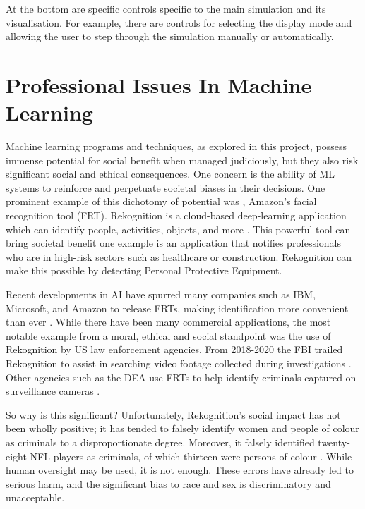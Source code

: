 \documentclass[]{final_report}
\begin{document}
At the bottom are specific controls specific to the main simulation and its visualisation. For example, there are controls for selecting the display mode and allowing the user to step through the simulation manually or automatically. 

\chapter{Professional Issues In Machine Learning}

Machine learning programs and techniques, as explored in this project, possess immense potential for social benefit when managed judiciously, but they also risk significant social and ethical consequences\cite{AISocialImpactAndAccountability}. One concern is the ability of ML systems to reinforce and perpetuate societal biases in their decisions\cite{AISocialImpactAndAccountability}. One prominent example of this dichotomy of potential was , Amazon's facial recognition tool (FRT)\cite{legislatingOG}. Rekognition is a cloud-based deep-learning application which can identify people, activities, objects, and more \cite{rekognitionOverview}. This powerful tool can bring societal benefit one example is an application that notifies professionals who are in high-risk sectors such as healthcare or construction\cite{rekognitionOverview}. Rekognition can make this possible by detecting Personal Protective Equipment. 

Recent developments in AI have spurred many companies such as IBM, Microsoft, and Amazon to release FRTs, making identification more convenient than ever \cite{facialRecognitionEthicsSurvay}. While there have been many commercial applications, the most notable example from a moral, ethical and social standpoint was the use of Rekognition by US law enforcement agencies. From 2018-2020 the FBI trailed Rekognition to assist in searching video footage collected during investigations \cite{facialRecognitionBias}. Other agencies such as the DEA use FRTs to help identify criminals captured on surveillance cameras \cite{facialRecognitionBias}. 

So why is this significant? Unfortunately, Rekognition's social impact has not been wholly positive; it has tended to falsely identify women and people of colour as criminals to a disproportionate degree\cite{legislatingRekognition}. Moreover, it falsely identified twenty-eight NFL players as
criminals, of which thirteen were persons of colour \cite{facialRecognitionBias}. While human oversight may be used, it is not enough. These errors have already led to serious harm, and the significant bias to race and sex is discriminatory and unacceptable.
\end{document}
